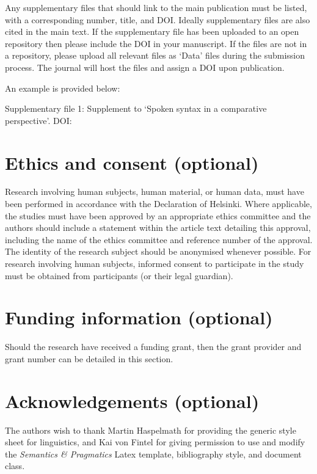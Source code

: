 \documentclass[charis,linguex,biblatex]{glossa}
\begin{document}
Any supplementary files that should link to the main publication must be listed, with a corresponding number, title, and DOI. Ideally supplementary files are also cited in the main text. If the supplementary file has been uploaded to an open repository then please include the DOI in your manuscript. If the files are not in a repository, please upload all relevant files as `Data' files during the submission process. The journal will host the files and assign a DOI upon publication. 

An example is provided below:

\noindent Supplementary file 1: Supplement to ‘Spoken syntax in a comparative perspective’. DOI: 

\section*{Ethics and consent (optional)}

Research involving human subjects, human material, or human data, must have been performed in accordance with the Declaration of Helsinki. Where applicable, the studies must have been approved by an appropriate ethics committee and the authors should include a statement within the article text detailing this approval, including the name of the ethics committee and reference number of the approval. The identity of the research subject should be anonymised whenever possible. For research involving human subjects, informed consent to participate in the study must be obtained from participants (or their legal guardian).


\section*{Funding information (optional)}

Should the research have received a funding grant, then the grant provider and grant number can be detailed in this section. 

\section*{Acknowledgements (optional)}

The authors wish to thank Martin Haspelmath for providing the generic style sheet for linguistics, and Kai von Fintel for giving permission to use and modify the \textit{Semantics \& Pragmatics} Latex template, bibliography style, and document class.
\end{document}
